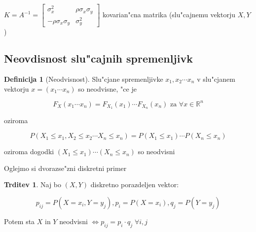 \documentclass[a4paper,12pt]{article}
\theoremstyle{definition}
\newtheorem{defn}[counter]{Definicija}
\newtheorem{claim}[counter]{Trditev}
\theoremstyle{remark}
\newcommand{\R}{\mathbb{R}}
\begin{document}
$K = A^{-1} = \begin{bmatrix}
    \sigma_x^2 & \rho \sigma_x \sigma_y \\
    -\rho \sigma_x \sigma_y & \sigma_y^2
\end{bmatrix}$ kovarian"cna matrika (slu"cajnemu vektorju $X,Y$)

\subsection{Neovdisnost slu"cajnih spremenljivk}

\begin{defn}[Neodvisnost]
    Slu"cjane spremenljivke $x_1, x_2 \cdots x_n$ v slu"cjanem vektorju $x = (x_1 \cdots x_n)$ so neodvisne,
    "ce je

    \begin{equation*}
        F_X(x_1 \cdots x_n) = F_{X_1}(x_1) \cdots F_{X_n}(x_n) \text{ za } \forall x \in \R^n
    \end{equation*}
    
    oziroma

    \begin{equation*}
        P(X_1 \leq x_1, X_2 \leq x_2 \cdots X_n \leq x_n) = P(X_1 \leq x_1) \cdots P(X_n \leq x_n)
    \end{equation*}

    oziroma dogodki $(X_1 \leq x_1) \cdots (X_n \leq x_n)$ so neodvisni
\end{defn}

Oglejmo si dvorazse"zni diskretni primer

\begin{claim}
    Naj bo $(X,Y)$ diskretno porazdeljen vektor:

    \begin{equation*}
        p_{ij} = P(X = x_i, Y = y_j), p_i = P(X = x_i), q_j = P(Y = y_j)
    \end{equation*}

    Potem sta $X$ in $Y$ neodvisni $\iff p_{ij} = p_i \cdot q_j \; \forall i,j$
\end{claim}
\end{document}
